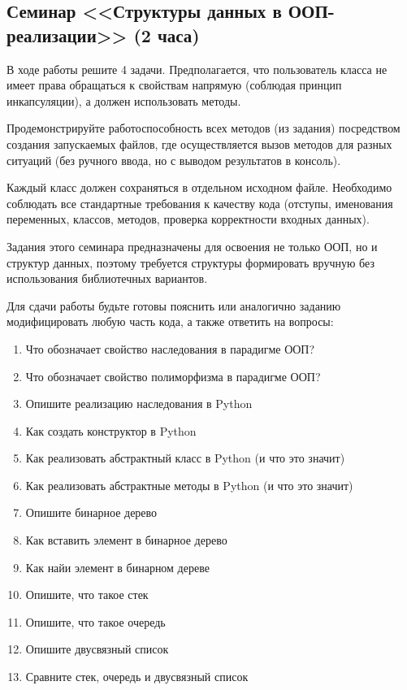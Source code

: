 \subsection{Семинар <<Структуры данных в ООП-реализации>>  
(2 часа)}


В ходе работы решите 4 задачи. 
Предполагается, что пользователь класса не имеет права обращаться к свойствам напрямую 
(соблюдая принцип инкапсуляции), а должен использовать методы. 

Продемонстрируйте работоспособность всех методов (из задания) 
посредством создания запускаемых файлов, где осуществляется 
вызов методов для разных ситуаций 
(без ручного ввода, но с выводом результатов в консоль). 

Каждый класс должен сохраняться в отдельном исходном файле. 
Необходимо соблюдать все стандартные требования к качеству кода 
(отступы, именования переменных, классов, методов, 
проверка корректности входных данных).

Задания этого семинара предназначены для освоения не только ООП, но и структур данных, поэтому
требуется структуры формировать вручную без использования библиотечных вариантов.

Для сдачи работы будьте готовы пояснить или аналогично заданию модифицировать любую часть кода, а также ответить на вопросы:
\begin{enumerate}
    \item Что обозначает свойство наследования в парадигме ООП?
    \item Что обозначает свойство полиморфизма в парадигме ООП?
    \item Опишите реализацию наследования в Python
    \item Как создать конструктор в Python
    \item Как реализовать абстрактный класс в Python (и что это значит)
    \item Как реализовать абстрактные методы в Python (и что это значит)
    \item Опишите бинарное дерево
    \item Как вставить элемент в бинарное дерево
    \item Как найи элемент в бинарном дереве
    \item Опишите, что такое стек
    \item Опишите, что такое очередь
    \item Опишите двусвязный список
    \item Сравните стек, очередь и двусвязный список
\end{enumerate}

